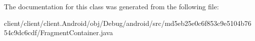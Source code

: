 The documentation for this class was generated from the following file\+:\begin{DoxyCompactItemize}
\item 
client/client/client.\+Android/obj/\+Debug/android/src/md5eb25e0c6f853c9e5104b7654c9dc6cdf/Fragment\+Container.\+java\end{DoxyCompactItemize}
